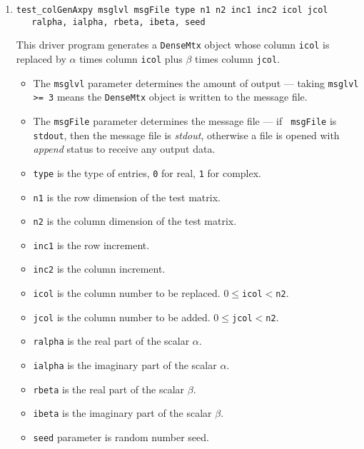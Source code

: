 \begin{enumerate}
\item
\begin{verbatim}
test_colGenAxpy msglvl msgFile type n1 n2 inc1 inc2 icol jcol 
   ralpha, ialpha, rbeta, ibeta, seed
\end{verbatim}
This driver program generates a {\tt DenseMtx} object whose
column {\tt icol} is replaced by $\alpha$ times column {\tt icol} 
plus $\beta$ times column {\tt jcol}.  
\par
\begin{itemize}
\item
The {\tt msglvl} parameter determines the amount of output ---
taking {\tt msglvl >= 3} means the {\tt DenseMtx} object is written
to the message file.
\item
The {\tt msgFile} parameter determines the message file --- if {\tt
msgFile} is {\tt stdout}, then the message file is {\it stdout},
otherwise a file is opened with {\it append} status to receive any
output data.
\item
{\tt type} is the type of entries, {\tt 0} for real, {\tt 1} for complex.
\item
{\tt n1} is the row dimension of the test matrix.
\item
{\tt n2} is the column dimension of the test matrix.
\item
{\tt inc1} is the row increment.
\item
{\tt inc2} is the column increment.
\item
{\tt icol} is the column number to be replaced.  $0\leq${\tt icol}$<${\tt n2}.
\item
{\tt jcol} is the column number to be added.  $0\leq${\tt jcol}$<${\tt n2}.
\item
{\tt ralpha} is the real part of the scalar $\alpha$.
\item
{\tt ialpha} is the imaginary part of the scalar $\alpha$.
\item
{\tt rbeta} is the real part of the scalar $\beta$.
\item
{\tt ibeta} is the imaginary part of the scalar $\beta$.
\item
{\tt seed} parameter is random number seed.
\end{itemize}


\end{enumerate}
